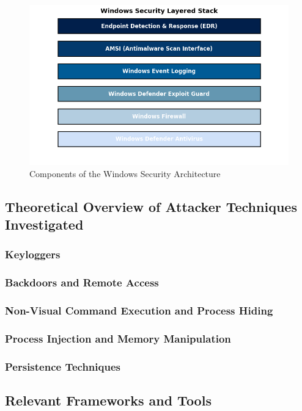 \documentclass[11pt]{article}
\begin{document}
				\begin{figure}[H]
					\centering
					\includegraphics[width=\linewidth]{Pictures/windowssecuritylayer}
					\caption{Components of the Windows Security Architecture}
					\label{fig:windowssecuritylayer}
				\end{figure}
				
				
			\subsection{Theoretical Overview of Attacker Techniques Investigated}
				\subsubsection{Keyloggers}
				\subsubsection{Backdoors and Remote Access}
				\subsubsection{Non-Visual Command Execution and Process Hiding}
				\subsubsection{Process Injection and Memory Manipulation}
				\subsubsection{Persistence Techniques}
			\subsection{Relevant Frameworks and Tools}
			
\end{document}
